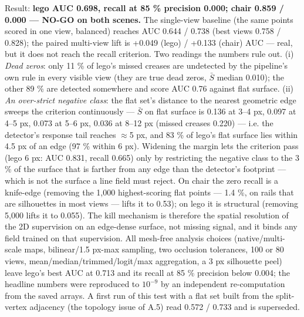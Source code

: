 Result: \textbf{lego AUC 0.698, recall at 85 \% precision 0.000; chair 0.859 / 0.000 --- NO-GO on
both scenes.} The single-view baseline (the same points scored in one view, balanced)
reaches AUC 0.644 / 0.738 (best views 0.758 / 0.828); the paired multi-view lift is
+0.049 (lego) / +0.133 (chair) AUC --- real, but it does not reach the recall criterion.
Two readings the numbers rule out. (i) \emph{Dead zeros}: only 11 \% of lego's missed creases
are undetected by the pipeline's own rule in every visible view (they are true dead
zeros, $\bar{S}$ median 0.010); the other 89 \% are detected somewhere and score AUC 0.76 against
flat surface. (ii) \emph{An over-strict negative class}: the flat set's distance to the nearest
geometric edge sweeps the criterion continuously --- $\bar{S}$ on flat surface is 0.136 at 3--4 px,
0.097 at 4--5 px, 0.073 at 5--6 px, 0.036 at 8--12 px (missed creases 0.220) --- i.e. the
detector's response tail reaches $\approx$5 px, and 83 \% of lego's flat surface lies within 4.5 px
of an edge (97 \% within 6 px). Widening the margin lets the criterion pass (lego 6 px:
AUC 0.831, recall 0.665) only by restricting the negative class to the 3 \% of the surface
that is farther from any edge than the detector's footprint --- which is not the surface a
line field must reject. On chair the zero recall is a knife-edge (removing the 1,000
highest-scoring flat points --- 1.4 \%, on rails that are silhouettes in most views --- lifts
it to 0.53); on lego it is structural (removing 5,000 lifts it to 0.055). The kill
mechanism is therefore the spatial resolution of the 2D supervision on an edge-dense
surface, not missing signal, and it binds any field trained on that supervision. All
mesh-free analysis choices (native/multi-scale maps, bilinear/1.5 px-max sampling, two
occlusion tolerances, 100 or 80 views, mean/median/trimmed/logit/max aggregation, a 3 px
silhouette peel) leave lego's best AUC at 0.713 and its recall at 85 \% precision below
0.004; the headline numbers were reproduced to $10^{-9}$ by an independent re-computation
from the saved arrays. A first run of this test with a flat set built from the
split-vertex adjacency (the topology issue of A.5) read 0.572 / 0.733 and is superseded.


